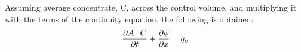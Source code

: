 Assuming average concentrate, C, across the control volume, and multiplying it with the terms of the continuity equation, the following is obtained:
\begin{equation}
	\frac{\partial A \cdot C}{\partial t} + \frac{\partial \phi}{\partial x}=q_c \\
\label{poop_mass_equation}
\end{equation}











